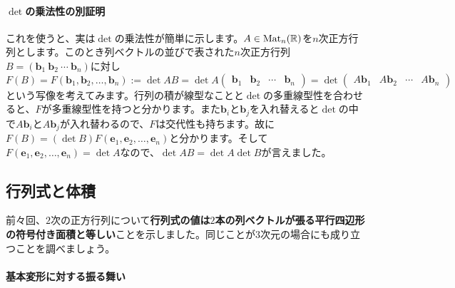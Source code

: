 \paragraph{$\det$の乗法性の別証明} これを使うと、実は$\det$の乗法性が簡単に示します。$A\in \operatorname{Mat}_n(\mathbb{R})$を$n$次正方行列とします。このとき列ベクトルの並びで表された$n$次正方行列$B = (\bm{b}_1 \ \bm{b}_2 \ \cdots \ \bm{b}_n)$に対し
\[
F(B) = F(\bm{b}_1, \bm{b}_2, \ldots, \bm{b}_n) :=
\det AB = \det A \begin{pmatrix} \bm{b}_1 & \bm{b}_2 & \cdots & \bm{b}_n \end{pmatrix}
= \det \begin{pmatrix} A\bm{b}_1 & A\bm{b}_2 & \cdots & A\bm{b}_n \end{pmatrix} 
\]
という写像を考えてみます。行列の積が線型なことと$\det$の多重線型性を合わせると、$F$が多重線型性を持つと分かります。また$\bm{b}_i$と$\bm{b}_j$を入れ替えると$\det$の中で$A\bm{b}_i$と$A\bm{b}_j$が入れ替わるので、$F$は交代性も持ちます。故に$F(B) = (\det B) F(\bm{e}_1, \bm{e}_2, \ldots, \bm{e}_n)$と分かります。そして$F(\bm{e}_1, \bm{e}_2, \ldots, \bm{e}_n) = \det A$なので、$\det AB = \det A \det B$が言えました。

\subsection{行列式と体積}

前々回、$2$次の正方行列について\textbf{行列式の値は$2$本の列ベクトルが張る平行四辺形の符号付き面積と等しい}ことを示しました。同じことが$3$次元の場合にも成り立つことを調べましょう。

\paragraph{基本変形に対する振る舞い}

